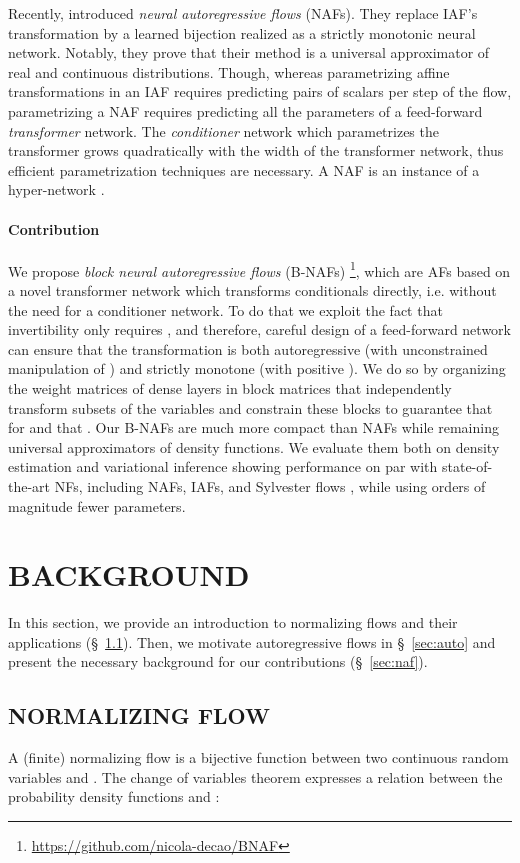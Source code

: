 \documentclass[letterpaper]{article}
\begin{document}
Recently, \citet{huang2018neural} introduced \emph{neural autoregressive flows} (NAFs). They replace IAF's transformation by a learned bijection realized as a strictly monotonic neural network. Notably, they prove that their method is a universal approximator of real and continuous distributions. Though, whereas parametrizing affine transformations in an IAF requires predicting  pairs of scalars per step of the flow, parametrizing a NAF requires predicting all the parameters of a feed-forward \emph{transformer} network. The \emph{conditioner} network which parametrizes the transformer grows quadratically with the width of the transformer network, thus efficient parametrization techniques are necessary. A NAF is an instance of a hyper-network \citep{ha2016hypernetworks}. 

\paragraph{Contribution} 
We propose \emph{block neural autoregressive flows} (B-NAFs)
\footnote{\url{https://github.com/nicola-decao/BNAF}},
which are AFs based on a novel transformer network which transforms conditionals directly, i.e. without the need for a conditioner network. To do that we exploit the fact that invertibility only requires , and therefore, careful design of a feed-forward network can ensure that the transformation is both autoregressive (with unconstrained manipulation of ) and strictly monotone (with positive ). We do so by organizing the weight matrices of dense layers in block matrices that independently transform subsets of the variables and constrain these blocks to guarantee that  for  and that . Our B-NAFs are much more compact than NAFs while remaining universal approximators of density functions. We evaluate them both on density estimation and variational inference showing performance on par with state-of-the-art NFs, including NAFs, IAFs, and Sylvester flows \citep{berg2018sylvester}, while using orders of magnitude fewer parameters. 

\section{BACKGROUND}
In this section, we provide an introduction to normalizing flows and their applications (\S~\ref{sec:nf}). 
Then, we motivate autoregressive flows in \S~\ref{sec:auto} and present the necessary background for our contributions (\S~\ref{sec:naf}).

\subsection{NORMALIZING FLOW} \label{sec:nf}
A (finite) normalizing flow is a bijective function  between two continuous random variables  and  \citep{tabak2010density}. The change of variables theorem expresses a relation between the probability density functions  and :
\end{document}
